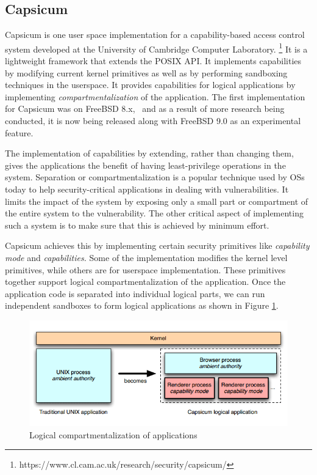 \subsection{Capsicum}
\label{subsec:capsicum}

Capsicum is one user space implementation for a capability-based access control system developed at the University of Cambridge Computer Laboratory. \footnote{https://www.cl.cam.ac.uk/research/security/capsicum/} It is a lightweight framework that extends the POSIX API. It implements capabilities by modifying current kernel primitives as well as by performing sandboxing techniques in the userspace. It provides capabilities for logical applications by implementing \textit{compartmentalization} of the application. The first implementation for Capsicum was on FreeBSD 8.x,~\cite{watson2010capsicum} and as a result of more research being conducted, it is now being released along with FreeBSD 9.0 as an experimental feature.

The implementation of capabilities by extending, rather than changing them, gives the applications the benefit of having least-privilege operations in the system. Separation or compartmentalization is a popular technique used by OSs today to help security-critical applications in dealing with vulnerabilities. It limits the impact of the system by exposing only a small part or compartment of the entire system to the vulnerability. The other critical aspect of implementing such a system is to make sure that this is achieved by minimum effort.

Capsicum achieves this by implementing certain security primitives like \textit{capability mode} and \textit{capabilities.} Some of the implementation modifies the kernel level primitives, while others are for userspace implementation. These primitives together support logical compartmentalization of the application. Once the application code is separated into individual logical parts, we can run independent sandboxes to form logical applications as shown in Figure \ref{compartment}.

\begin{figure}[t]
\centering
\includegraphics[scale=0.39]{img/capcisum_sandbox}
\caption{Logical compartmentalization of applications}
\label{compartment}
\end{figure}

